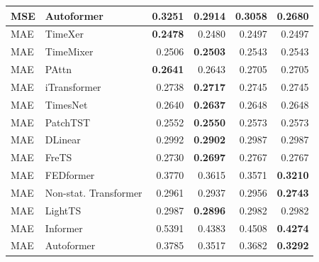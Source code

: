\begin{longtable}{llrrrr}
MSE & Autoformer & 0.3251 & 0.2914 & 0.3058 & \textbf{0.2680} \\
\midrule
MAE & TimeXer & \textbf{0.2478} & 0.2480 & 0.2497 & 0.2497 \\
MAE & TimeMixer & 0.2506 & \textbf{0.2503} & 0.2543 & 0.2543 \\
MAE & PAttn & \textbf{0.2641} & 0.2643 & 0.2705 & 0.2705 \\
MAE & iTransformer & 0.2738 & \textbf{0.2717} & 0.2745 & 0.2745 \\
MAE & TimesNet & 0.2640 & \textbf{0.2637} & 0.2648 & 0.2648 \\
MAE & PatchTST & 0.2552 & \textbf{0.2550} & 0.2573 & 0.2573 \\
MAE & DLinear & 0.2992 & \textbf{0.2902} & 0.2987 & 0.2987 \\
MAE & FreTS & 0.2730 & \textbf{0.2697} & 0.2767 & 0.2767 \\
MAE & FEDformer & 0.3770 & 0.3615 & 0.3571 & \textbf{0.3210} \\
MAE & Non-stat. Transformer & 0.2961 & 0.2937 & 0.2956 & \textbf{0.2743} \\
MAE & LightTS & 0.2987 & \textbf{0.2896} & 0.2982 & 0.2982 \\
MAE & Informer & 0.5391 & 0.4383 & 0.4508 & \textbf{0.4274} \\
MAE & Autoformer & 0.3785 & 0.3517 & 0.3682 & \textbf{0.3292} \\
\end{longtable}
\endgroup

